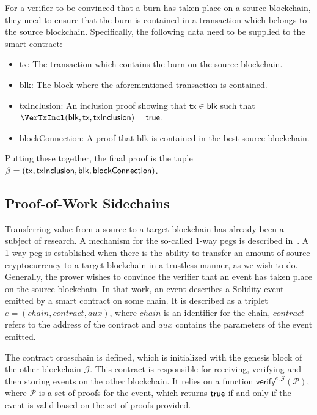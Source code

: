 For a verifier to be convinced that a burn has taken place on a source blockchain, they need to ensure that the burn is contained in a transaction which belongs to the source blockchain. Specifically, the following data need to be supplied to the smart contract:

\begin{itemize}
  \item \textsf{tx}: The transaction which contains the burn on the source blockchain.
  \item \textsf{blk}: The block where the aforementioned transaction is contained.
  \item \textsf{txInclusion}: An inclusion proof showing that $\mathsf{tx} \in \mathsf{blk}$ such that $\VerTxIncl(\textsf{blk}, \textsf{tx}, \textsf{txInclusion}) = \true$.
  \item \textsf{blockConnection}: A proof that \textsf{blk} is contained in the best source blockchain.
\end{itemize}

Putting these together, the final proof is the tuple $\beta = \sf(tx, txInclusion, blk, blockConnection)$.

\subsection{Proof-of-Work Sidechains}
Transferring value from a source to a target blockchain has already been a subject of research. A mechanism for the so-called 1-way pegs is described in~\cite{pow-sidechains}. A 1-way peg is established when there is the ability to transfer an amount of source cryptocurrency to a target blockchain in a trustless manner, as we wish to do. Generally, the prover wishes to convince the verifier that an event has taken place on the source blockchain. In that work, an event describes a Solidity event emitted by a smart contract on some chain. It is described as a triplet $e = (chain, contract, aux)$, where $chain$ is an identifier for the chain, $contract$ refers to the address of the contract and $aux$ contains the parameters of the event emitted.

The contract \textsf{crosschain} is defined, which is initialized with the genesis block of the other blockchain $\mathcal{G}$. This contract is responsible for receiving, verifying and then storing events on the other blockchain. It relies on a function $\mathsf{verify}^{e,\mathcal{G}}(\mathcal{P})$, where $\mathcal{P}$ is a set of proofs for the event, which returns $\mathsf{true}$ if and only if the event is valid based on the set of proofs provided.


